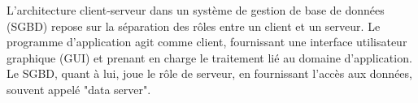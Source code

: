 \documentclass[a4paper]{report}
\begin{document}
    \begin{Définition}
    L'architecture client-serveur dans un système de gestion de base de données (SGBD) repose 
    sur la séparation des rôles entre un client et un serveur. Le programme d'application 
    agit comme client, fournissant une interface utilisateur graphique (GUI) et prenant 
    en charge le traitement lié au domaine d'application. Le SGBD, quant à lui, joue le rôle 
    de serveur, en fournissant l'accès aux données, souvent appelé "data server". 
    \end{Définition}






    



\end{document}
